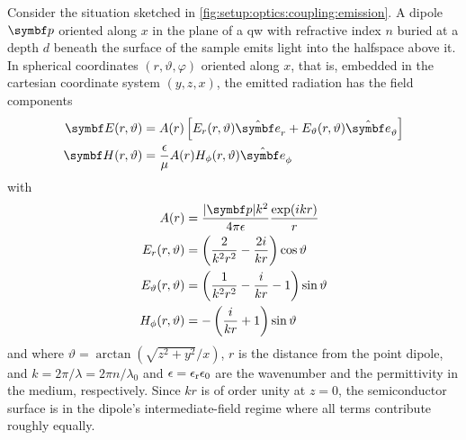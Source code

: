 Consider the situation sketched in \cref{fig:setup:optics:coupling:emission}.
A dipole $\bvec{p}$ oriented along $x$ in the plane of a  \gls{qw} with refractive index $n$ buried at a depth $d$ beneath the surface of the sample emits light into the halfspace above it.
In spherical coordinates $(r, \vartheta, \varphi)$ oriented along $x$, that is, embedded in the cartesian coordinate system $(y, z, x)$, the emitted radiation has the field components~\cite{Griffiths2013}
\begin{align}
    \bvec{E}(r, \vartheta) &= A(r)\left[E_r(r, \vartheta)\ubvec{r} + E_{\vartheta}(r, \vartheta)\ubvec{\vartheta}\right] \label{eq:setup:optics:coupling:dipole:efield}\\
    \bvec{H}(r, \vartheta) &= \frac{\epsilon}{\mu} A(r) H_{\phi}(r, \vartheta)\ubvec{\phi} \label{eq:setup:optics:coupling:dipole:hfield}
\end{align}
with
\begin{align}
    A(r) &= \frac{\abs{\bvec{p}}k^2}{4\pi\epsilon}\frac{\exp(\i k r)}{r} \\
    E_r(r, \vartheta) &= \left(\frac{2}{k^2 r^2} - \frac{2\i}{k r}\right)\cos\vartheta \\
    E_{\vartheta}(r, \vartheta) &= \left(\frac{1}{k^2 r^2} - \frac{\i}{k r} - 1\right)\sin\vartheta \\
    H_{\phi}(r, \vartheta) &= -\left(\frac{\i}{k r} + 1\right)\sin\vartheta
\end{align}
and where $\vartheta=\arctan\left(\sqrt{z^2 + y^2}/x\right)$, $r$ is the distance from the point dipole, and $k=2\pi/\lambda=2\pi n/\lambda_0$ and $\epsilon=\epsilon_{\mathrm{r}}\epsilon_0$ are the wavenumber and the permittivity in the medium, respectively.
Since $kr$ is of order unity at $z=0$, the semiconductor surface is in the dipole's intermediate-field regime where all terms contribute roughly equally.

